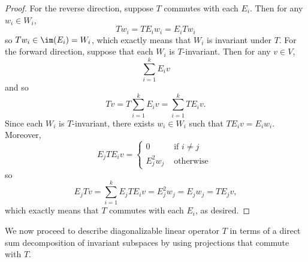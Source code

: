 \documentclass[math_245.tex]{subfiles}
\begin{document}
    \begin{proof}
        For the reverse direction, suppose $T$ commutes with each $E_i$. Then for any $w_i\in W_i$,
        \begin{equation*}
            Tw_i = TE_iw_i = E_iTw_i
        \end{equation*}
        so $Tw_i\in \im(E_i) = W_i$, which exactly means that $W_i$ is invariant under $T$. For the forward direction, suppose that each $W_i$ is $T$-invariant. Then for any $v\in V$,
        \begin{equation*}
            \sum^{k}_{i=1} E_iv
        \end{equation*}
        and so
        \begin{equation*}
            Tv = T \sum^{k}_{i=1} E_iv = \sum^{k}_{i=1} TE_iv.
        \end{equation*}
        Since each $W_i$ is $T$-invariant, there exists $w_i\in W_i$ such that $TE_iv = E_iw_i$. Moreover,
        \begin{equation*}
            E_jTE_iv =
            \begin{cases}
                0 & \text{ if }i\neq j \\
                E_j^2w_j & \text{ otherwise }
            \end{cases}
        \end{equation*}
        so
        \begin{equation*}
            E_jTv = \sum^{k}_{i=1} E_jTE_iv = E_j^2w_j = E_jw_j = TE_jv,
        \end{equation*}
        which exactly means that $T$ commutes with each $E_i$, as desired.
    \end{proof}

    \begin{remark}
        We now proceed to describe diagonalizable linear operator $T$ in terms of a direct sum decomposition of invariant subspaces by using projections that commute with $T$.
    \end{remark}
\end{document}
